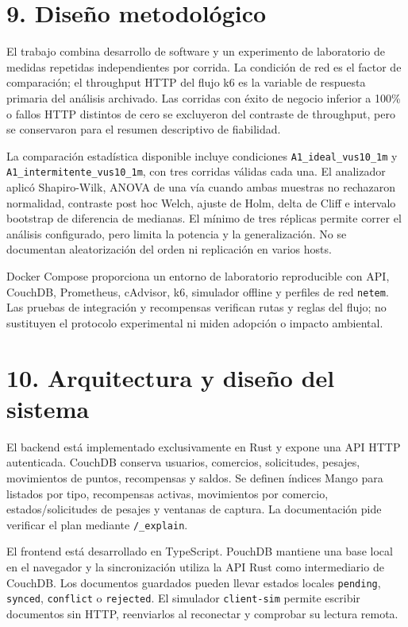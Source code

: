 \documentclass[
  spanish,
  12pt,
  a4paper,
]{article}
\begin{document}
\section{9. Diseño metodológico}\label{diseuxf1o-metodoluxf3gico}

El trabajo combina desarrollo de software y un experimento de
laboratorio de medidas repetidas independientes por corrida. La
condición de red es el factor de comparación; el throughput HTTP del
flujo k6 es la variable de respuesta primaria del análisis archivado.
Las corridas con éxito de negocio inferior a 100\% o fallos HTTP
distintos de cero se excluyeron del contraste de throughput, pero se
conservaron para el resumen descriptivo de fiabilidad.

La comparación estadística disponible incluye condiciones
\texttt{A1\_ideal\_vus10\_1m} y \texttt{A1\_intermitente\_vus10\_1m},
con tres corridas válidas cada una. El analizador aplicó Shapiro-Wilk,
ANOVA de una vía cuando ambas muestras no rechazaron normalidad,
contraste post hoc Welch, ajuste de Holm, delta de Cliff e intervalo
bootstrap de diferencia de medianas. El mínimo de tres réplicas permite
correr el análisis configurado, pero limita la potencia y la
generalización. No se documentan aleatorización del orden ni replicación
en varios hosts.

Docker Compose proporciona un entorno de laboratorio reproducible con
API, CouchDB, Prometheus, cAdvisor, k6, simulador offline y perfiles de
red \texttt{netem}. Las pruebas de integración y recompensas verifican
rutas y reglas del flujo; no sustituyen el protocolo experimental ni
miden adopción o impacto ambiental.

\section{10. Arquitectura y diseño del
sistema}\label{arquitectura-y-diseuxf1o-del-sistema}

El backend está implementado exclusivamente en Rust y expone una API
HTTP autenticada. CouchDB conserva usuarios, comercios, solicitudes,
pesajes, movimientos de puntos, recompensas y saldos. Se definen índices
Mango para listados por tipo, recompensas activas, movimientos por
comercio, estados/solicitudes de pesajes y ventanas de captura. La
documentación pide verificar el plan mediante \texttt{/\_explain}.

El frontend está desarrollado en TypeScript. PouchDB mantiene una base
local en el navegador y la sincronización utiliza la API Rust como
intermediario de CouchDB. Los documentos guardados pueden llevar estados
locales \texttt{pending}, \texttt{synced}, \texttt{conflict} o
\texttt{rejected}. El simulador \texttt{client-sim} permite escribir
documentos sin HTTP, reenviarlos al reconectar y comprobar su lectura
remota.
\end{document}
